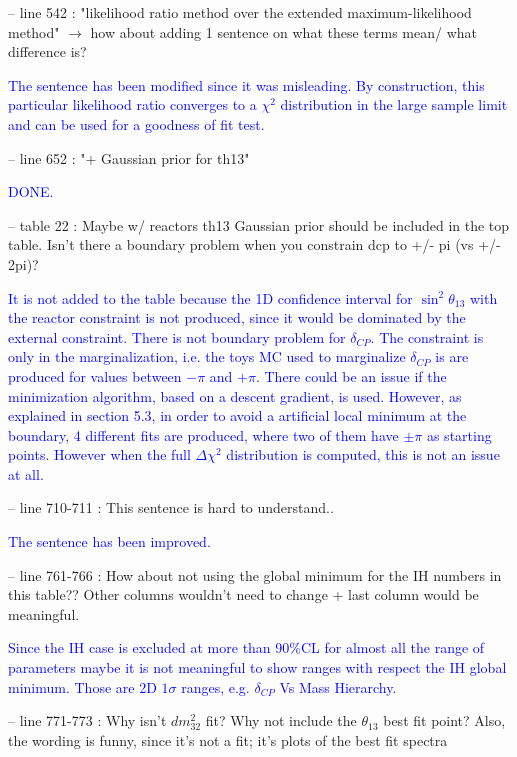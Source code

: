 \documentclass[final]{elsarticle}
\begin{document}
-- line 542 : "likelihood ratio method over the extended maximum-likelihood
method" $\rightarrow$ how about adding 1 sentence on what these terms mean/ what
difference is?

\textcolor{blue}{The sentence has been modified since it was misleading. By construction, this particular likelihood ratio converges to a $\chi^2$
distribution in the large sample limit and can be used for a goodness of fit test.}

-- line 652 : "+ Gaussian prior for th13"

\textcolor{blue}{DONE.}

-- table 22 : Maybe w/ reactors th13 Gaussian prior should be included in the
top table.  Isn't there a boundary problem when you constrain dcp to +/- pi
(vs +/- 2pi)?

\textcolor{blue}{It is not added to the table because the 1D confidence interval for $\sin^2 \theta_{13}$ with 
the reactor constraint is not produced, since it would be dominated by the external constraint. 
There is not boundary problem for $\delta_{CP}$. The constraint is only in the marginalization, i.e. the 
toys MC used to marginalize $\delta_{CP}$ is are produced for values between $-\pi$ and $+\pi$.
There could be an issue if the minimization algorithm, based on a descent gradient, is used.
However, as explained in section 5.3, in order to avoid a artificial local minimum at the boundary, 
4 different fits are produced, where two of them have $\pm \pi$ as starting points.
However when the full $\Delta \chi^2$ distribution is computed, this is not an issue at all. }

-- line 710-711 : This sentence is hard to understand..

\textcolor{blue}{The sentence has been improved.}

-- line 761-766 : How about not using the global minimum for the IH numbers in
this table??  Other columns wouldn't need to change + last column would be
meaningful.

\textcolor{blue}{Since the IH case is excluded at more than 90\%CL for almost all the range of parameters 
maybe it is not meaningful to show ranges with respect the IH global minimum. 
Those are 2D $1\sigma$ ranges, e.g. $\delta_{CP}$ Vs Mass Hierarchy.}


-- line 771-773 : Why isn't $dm^2_32$ fit?  Why not include the $\theta_{13}$ best fit
point?  Also, the wording is funny, since it's not a fit; it's plots of the best fit spectra
\end{document}
